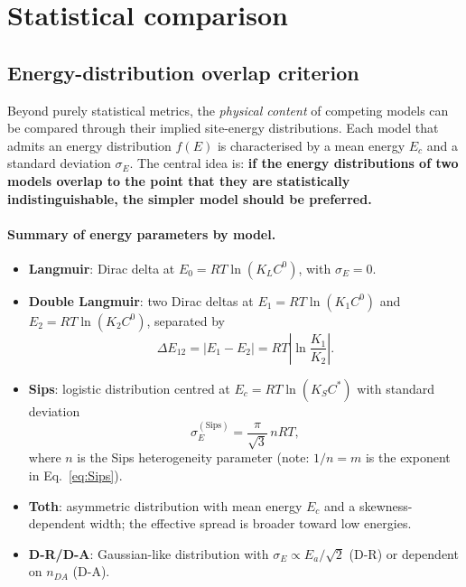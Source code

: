 ﻿	\section{Statistical comparison}
	\subsection{Energy-distribution overlap criterion}

	Beyond purely statistical metrics, the \emph{physical content} of
	competing models can be compared through their implied site-energy
	distributions. Each model that admits an energy distribution
	$f(E)$ is characterised by a mean energy $E_c$ and a standard
	deviation $\sigma_E$. The central idea is: \textbf{if the energy
	distributions of two models overlap to the point that they are
	statistically indistinguishable, the simpler model should be
	preferred.}

	\paragraph{Summary of energy parameters by model.}

	\begin{itemize}
		\item \textbf{Langmuir}: Dirac delta at
		$E_0 = RT\ln(K_L C^0)$, with $\sigma_E = 0$.
		\item \textbf{Double Langmuir}: two Dirac deltas at
		$E_1 = RT\ln(K_1 C^0)$ and $E_2 = RT\ln(K_2 C^0)$,
		separated by
		\begin{equation}
			\Delta E_{12} = |E_1 - E_2|
			= RT\left|\ln\frac{K_1}{K_2}\right|.
			\label{eq:DeltaE12}
		\end{equation}
		\item \textbf{Sips}: logistic distribution centred at
		$E_c = RT\ln(K_S C^{\ast})$ with standard deviation
		\begin{equation}
			\sigma_E^{\mathrm{(Sips)}}
			= \frac{\pi}{\sqrt{3}}\,nRT,
			\label{eq:sigma_sips_stat}
		\end{equation}
		where $n$ is the Sips heterogeneity parameter (note: $1/n = m$
		is the exponent in Eq.~\eqref{eq:Sips}).
		\item \textbf{Toth}: asymmetric distribution with mean energy
		$E_c$ and a skewness-dependent width; the effective spread is
		broader toward low energies.
		\item \textbf{D-R/D-A}: Gaussian-like distribution with
		$\sigma_E \propto E_a / \sqrt{2}$ (D-R) or dependent on
		$n_{DA}$ (D-A).
	\end{itemize}

